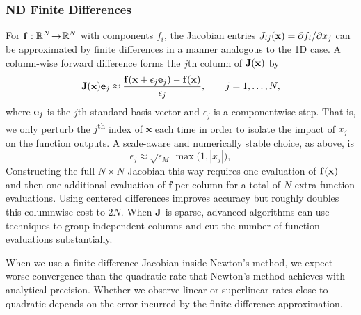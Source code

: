 \subsubsection{ND Finite Differences}
For $\mathbf{f}:\mathbb{R}^N\!\to\!\mathbb{R}^N$ with components $f_i$, the Jacobian entries $J_{ij}(\mathbf{x})=\partial f_i/\partial x_j$ can be approximated by finite differences in a manner analogous to the 1D case. A column-wise forward difference forms the $j$th column of $\mathbf{J}(\mathbf{x})$ by
\begin{equation}
  \mathbf{J}(\mathbf{x})\mathbf{e}_j
  \approx
  \frac{\mathbf{f}(\mathbf{x}+\epsilon_j \mathbf{e}_j)-\mathbf{f}(\mathbf{x})}{\epsilon_j},
  \qquad j=1,\ldots,N,
\end{equation}
where $\mathbf{e}_j$ is the $j$th standard basis vector and $\epsilon_j$ is a componentwise step. That is, we only perturb the $j$\textsuperscript{th} index of $\mathbf{x}$ each time in order to isolate the impact of $x_j$ on the function outputs. A scale-aware and numerically stable choice, as above, is
\begin{equation}
  \epsilon_j \approx \sqrt{\epsilon_M}\,\max\!\bigl(1,|x_j|\bigr),
\end{equation}
Constructing the full $N\times N$ Jacobian this way requires one evaluation of $\mathbf{f}(\mathbf{x})$ and then one additional evaluation of $\mathbf f$ per column for a total of $N$ extra function evaluations. Using centered differences improves accuracy but roughly doubles this columnwise cost to $2N$. When $\mathbf{J}$ is sparse, advanced algorithms can use techniques to group independent columns and cut the number of function evaluations substantially.

When we use a finite-difference Jacobian inside Newton's method, we expect worse convergence than the quadratic rate that Newton's method achieves with analytical precision. Whether we observe linear or superlinear rates close to quadratic depends on the error incurred by the finite difference approximation. 

